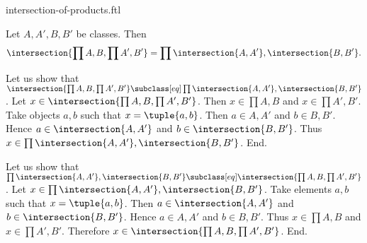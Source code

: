 \documentclass{article}
\begin{document}
\begin{smodule}[creators={Marcel Schütz}]{intersection-of-products.ftl}

  \begin{fproposition*}[label=6608396469927936]
    Let $A, A', B, B'$ be classes.
    Then \[\intersection{\prod{A,B},\prod{A',B'}} = \prod{\intersection{A,A'},\intersection{B,B'}}.\]
  \end{fproposition*}
  \begin{fproof}
    Let us show that $\intersection{\prod{A,B},\prod{A',B'}} \subclass[eq] \prod{\intersection{A,A'},\intersection{B,B'}}$.
      Let $x \in \intersection{\prod{A,B},\prod{A',B'}}$.
      Then $x \in \prod{A,B}$ and $x \in \prod{A',B'}$.
      Take objects $a, b$ such that $x = \tuple{a,b}$.
      Then $a \in A, A'$ and $b \in B, B'$.
      Hence $a \in \intersection{A,A'}$ and $b \in \intersection{B,B'}$.
      Thus $x \in \prod{\intersection{A,A'},\intersection{B,B'}}$.
    End.

    Let us show that $\prod{\intersection{A,A'},\intersection{B,B'}} \subclass[eq] \intersection{\prod{A,B},\prod{A',B'}}$.
      Let $x \in \prod{\intersection{A,A'},\intersection{B,B'}}$.
      Take elements $a, b$ such that $x = \tuple{a,b}$.
      Then $a \in \intersection{A,A'}$ and $b \in \intersection{B,B'}$.
      Hence $a \in A, A'$ and $b \in B, B'$.
      Thus $x \in \prod{A,B}$ and $x \in \prod{A',B'}$.
      Therefore $x \in \intersection{\prod{A,B},\prod{A',B'}}$.
    End.
  \end{fproof}
\end{smodule}
\end{document}
